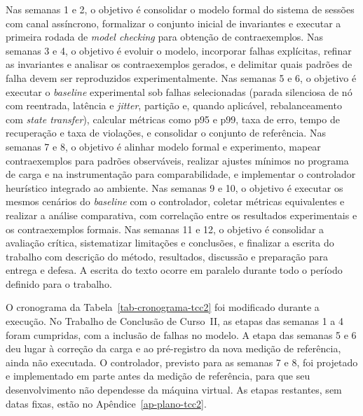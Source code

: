 Nas semanas 1 e 2, o objetivo é consolidar o modelo formal do sistema de sessões com canal assíncrono, formalizar o conjunto inicial de invariantes e executar a primeira rodada de \emph{model checking} para obtenção de contraexemplos. Nas semanas 3 e 4, o objetivo é evoluir o modelo, incorporar falhas explícitas, refinar as invariantes e analisar os contraexemplos gerados, e delimitar quais padrões de falha devem ser reproduzidos experimentalmente. Nas semanas 5 e 6, o objetivo é executar o \emph{baseline} experimental sob falhas selecionadas (parada silenciosa de nó com reentrada, latência e \emph{jitter}, partição e, quando aplicável, rebalanceamento com \emph{state transfer}), calcular métricas como p95 e p99, taxa de erro, tempo de recuperação e taxa de violações, e consolidar o conjunto de referência. Nas semanas 7 e 8, o objetivo é alinhar modelo formal e experimento, mapear contraexemplos para padrões observáveis, realizar ajustes mínimos no programa de carga e na instrumentação para comparabilidade, e implementar o controlador heurístico integrado ao ambiente. Nas semanas 9 e 10, o objetivo é executar os mesmos cenários do \emph{baseline} com o controlador, coletar métricas equivalentes e realizar a análise comparativa, com correlação entre os resultados experimentais e os contraexemplos formais. Nas semanas 11 e 12, o objetivo é consolidar a avaliação crítica, sistematizar limitações e conclusões, e finalizar a escrita do trabalho com descrição do método, resultados, discussão e preparação para entrega e defesa. A escrita do texto ocorre em paralelo durante todo o período definido para o trabalho.

O cronograma da Tabela~\ref{tab-cronograma-tcc2} foi modificado durante a execução. No Trabalho de Conclusão de Curso~II, as etapas das semanas 1 a 4 foram cumpridas, com a inclusão de falhas no modelo. A etapa das semanas 5 e 6 deu lugar à correção da carga e ao pré-registro da nova medição de referência, ainda não executada. O controlador, previsto para as semanas 7 e 8, foi projetado e implementado em parte antes da medição de referência, para que seu desenvolvimento não dependesse da máquina virtual. As etapas restantes, sem datas fixas, estão no Apêndice~\ref{ap-plano-tcc2}.

